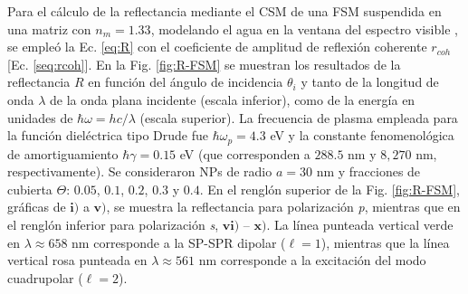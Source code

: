 	
Para el cálculo de la reflectancia mediante el CSM de una FSM suspendida en una matriz con $n_m=1.33$, modelando el agua en la ventana del espectro visible \cite{hale973optical}, se empleó la Ec.  \eqref{eq:R} con el coeficiente de amplitud de reflexión coherente $r_{coh}$ [Ec.  \eqref{seq:rcoh}].  En la Fig.  \ref{fig:R-FSM} se muestran los resultados de la reflectancia $R$ en función del ángulo de incidencia $\theta_i$ y tanto de la longitud de onda $\lambda$ de la onda plana incidente (escala inferior), como de la energía en unidades de $\hbar\omega = h c /\lambda$ (escala superior).  La frecuencia de plasma empleada para la función dieléctrica tipo Drude fue $\hbar\omega_p = 4. 3$ eV y la constante fenomenológica de amortiguamiento $\hbar\gamma = 0. 15$ eV (que corresponden a $288. 5$ nm  y $8,270$ nm, respectivamente). Se consideraron NPs de radio $a=30$ nm y fracciones de cubierta $\Theta$: $0. 05$, $0. 1$, $0. 2$, $0. 3$ y $0. 4$. En el renglón superior de la Fig. \ref{fig:R-FSM}, gráficas de $\mathbf{i)}$ a $\mathbf{v)}$, se muestra la reflectancia para polarización \emph{p}, mientras que en el renglón inferior  para polarización \emph{s}, $\mathbf{vi)}$ -- $\mathbf{x)}$. La línea punteada vertical verde  en $\lambda \approx 658$ nm corresponde a la SP-SPR dipolar ($\ell = 1$), mientras que la línea vertical rosa punteada en $\lambda \approx 561$ nm corresponde a la excitación del modo cuadrupolar ($\ell=2$).
					
